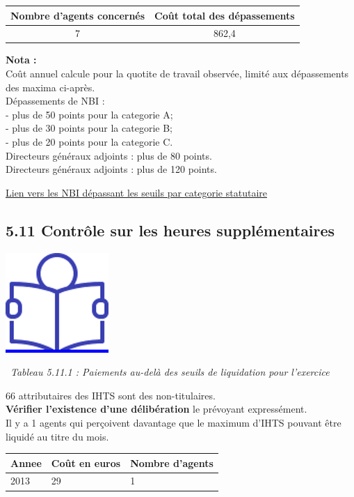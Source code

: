 \begin{longtable}[]{@{}cc@{}}
\toprule
Nombre d'agents concernés & Coût total des dépassements\tabularnewline
\midrule
\endhead
7 & 862,4\tabularnewline
\bottomrule
\end{longtable}

\textbf{Nota :}\\
Coût annuel calcule pour la quotite de travail observée, limité aux
dépassements des maxima ci-après.\\
Dépassements de NBI :\\
- plus de 50 points pour la categorie A;\\
- plus de 30 points pour la categorie B;\\
- plus de 20 points pour la categorie C.\\
Directeurs généraux adjoints : plus de 80 points.\\
Directeurs généraux adjoints : plus de 120 points.

\href{../Bases/Reglementation/NBI.cat.irreg.csv}{Lien vers les NBI
dépassant les seuils par categorie statutaire}

\hypertarget{controle-sur-les-heures-supplementaires}{%
\subsection{5.11 Contrôle sur les heures
supplémentaires}\label{controle-sur-les-heures-supplementaires}}

\href{../Docs/Notices/fiche_IHTS.odt}{\includegraphics{icones/Notice.png}}

~\emph{Tableau 5.11.1 : Paiements au-delà des seuils de liquidation pour
l'exercice}

66 attributaires des IHTS sont des non-titulaires.\\
\textbf{Vérifier l'existence d'une délibération} le prévoyant
expressément.\\
Il y a 1 agents qui perçoivent davantage que le maximum d'IHTS pouvant
être liquidé au titre du mois.

\begin{longtable}[]{@{}lll@{}}
\toprule
Annee & Coût en euros & Nombre d'agents\tabularnewline
\midrule
\endhead
2013 & 29 & 1\tabularnewline
\bottomrule
\end{longtable}

